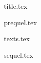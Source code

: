 \documentclass[ngerman, 11pt, a4paper]{article}
\begin{document}
{title.tex}

{prequel.tex}

{texts.tex}

{sequel.tex}
\end{document}
